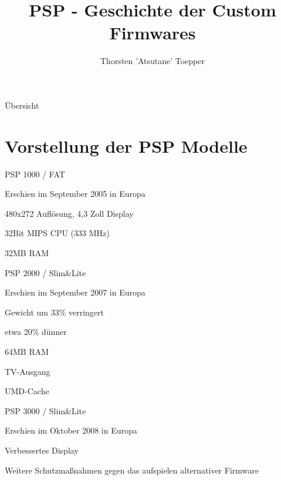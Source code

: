 \documentclass[mode=print,paper=screen,size=10pt,style=paintings]{powerdot}
\author{Thorsten 'Atsutane' Toepper}
\title{PSP - Geschichte der Custom Firmwares}
\newcommand{\Anf}[1]{\glqq #1\grqq}
\begin{document}
\maketitle
\begin{slide}{Übersicht}
  \tableofcontents[content=sections]
\end{slide}


\section{Vorstellung der PSP Modelle}
\begin{slide}{PSP 1000 / FAT}
	\begin{list}{-}{}
		\item{Erschien im September 2005 in Europa}
		\item{480x272 Auflösung, 4,3 Zoll Display}
		\item{32Bit MIPS CPU (333 MHz)}
		\item{32MB RAM}
	\end{list}
\end{slide}

\begin{slide}{PSP 2000 / Slim\&Lite}
	\begin{list}{-}{}
		\item{Erschien im September 2007 in Europa}
		\item{Gewicht um 33\% verringert}
		\item{etwa 20\% dünner}
		\item{64MB RAM}
		\item{TV-Ausgang}
		\item{UMD-Cache}
	\end{list}
\end{slide}

\begin{slide}{PSP 3000 / Slim\&Lite}
	\begin{list}{-}{}
		\item{Erschien im Oktober 2008 in Europa}
		\item{\Anf{Verbessertes} Display}
		\item{Weitere Schutzmaßnahmen gegen das aufspielen alternativer Firmware}
	\end{list}
\end{slide}
\end{document}
